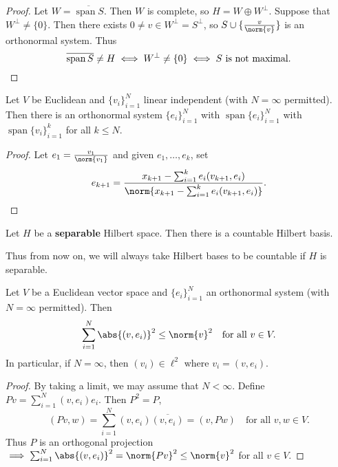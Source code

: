 \documentclass{article}
\DeclareMathOperator{\spn}{span}
\begin{document}
\begin{proof}
    Let $W = \overline{\spn S}$. Then $W$ is complete, so $H = W \oplus W^\bot$. Suppose that $W^\bot \neq \{0\}$.
    Then there exists $0 \neq v \in W^\bot = S^\bot$, so $S \cup \{\frac{v}{\norm{v}}\}$ is an orthonormal system. Thus
    \begin{equation*}
        \overline{\spn S} \neq H \iff W^\bot \neq \{0\} \iff S \text{ is not maximal.} \qedhere
    \end{equation*}
\end{proof}

\begin{fact}
    Let $V$ be Euclidean and $\{v_i\}_{i=1}^N$ linear independent (with $N = \infty$ permitted).
    Then there is an orthonormal system $\{e_i\}_{i=1}^N$ with $\spn \{e_i\}_{i=1}^N$ with $\spn \{v_i\}_{i=1}^k$ for all $k \leq N$.
\end{fact}

\begin{proof}
    Let $e_1 = \frac{v_1}{\norm{v_1}}$ and given $e_1, \dotsc, e_k$, set
    \begin{equation*}
        e_{k+1} = \frac{x_{k+1} - \sum_{i=1}^k e_i (v_{k+1}, e_i)}{\norm{x_{k+1} - \sum_{i=1}^k e_i (v_{k+1}, e_i)}}.\qedhere
    \end{equation*}
\end{proof}

\begin{cor}
    Let $H$ be a \textbf{separable} Hilbert space. Then there is a countable Hilbert basis.
\end{cor}
Thus from now on, we will always take Hilbert bases to be countable if $H$ is separable.

\begin{prop}
    Let $V$ be a Euclidean vector space and $\{e_i\}_{i=1}^N$ an orthonormal system (with $N=\infty$ permitted). Then
    \begin{equation*}
        \sum_{i=1}^N \abs{(v, e_i)}^2 \leq \norm{v}^2 \quad \text{for all } v \in V.
    \end{equation*}
    In particular, if $N = \infty$, then $(v_i) \in \ell^2$ where $v_i = (v, e_i)$.
\end{prop}

\begin{proof}
    By taking a limit, we may assume that $N < \infty$. Define $Pv = \sum_{i=1}^N (v, e_i) e_i$. Then $P^2 = P$,
    \begin{equation*}
        (Pv, w) = \sum_{i=1}^N (v, e_i) \overline{(v, e_i)} = (v, Pw) \quad \text{for all } v, w \in V.
    \end{equation*}
    Thus $P$ is an orthogonal projection $\implies \sum_{i=1}^N \abs{(v, e_i)}^2 = \norm{Pv}^2 \leq \norm{v}^2$ for all $v \in V$.
\end{proof}
\end{document}
